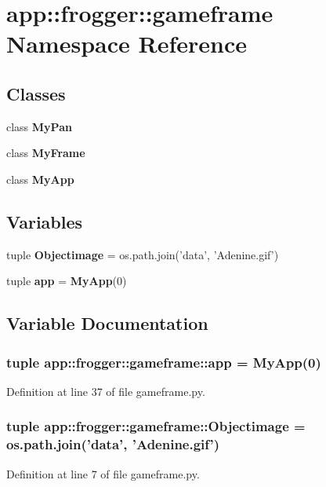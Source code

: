 \section{app::frogger::gameframe Namespace Reference}
\label{namespaceapp_1_1frogger_1_1gameframe}


\subsection*{Classes}
\begin{CompactItemize}
\item 
class {\bf MyPan}
\item 
class {\bf MyFrame}
\item 
class {\bf MyApp}
\end{CompactItemize}
\subsection*{Variables}
\begin{CompactItemize}
\item 
tuple {\bf Objectimage} = os.path.join('data', 'Adenine.gif')
\item 
tuple {\bf app} = {\bf MyApp}(0)
\end{CompactItemize}


\subsection{Variable Documentation}
\subsubsection{\setlength{\rightskip}{0pt plus 5cm}tuple {\bf app::frogger::gameframe::app} = {\bf MyApp}(0)\hspace{0.3cm}{\tt  [static]}}\label{namespaceapp_1_1frogger_1_1gameframe_9dcda37fd2b79d1a66ba37e7b50528bf}




Definition at line 37 of file gameframe.py.
\subsubsection{\setlength{\rightskip}{0pt plus 5cm}tuple {\bf app::frogger::gameframe::Objectimage} = os.path.join('data', 'Adenine.gif')\hspace{0.3cm}{\tt  [static]}}\label{namespaceapp_1_1frogger_1_1gameframe_4104e1852d6bcfaed9d70ce589f00f01}




Definition at line 7 of file gameframe.py.